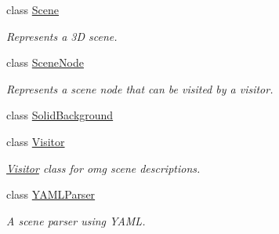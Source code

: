 \begin{DoxyCompactItemize}
class \mbox{\hyperlink{classomg_1_1_scene}{Scene}}
\begin{DoxyCompactList}\small\item\em Represents a 3D scene. \end{DoxyCompactList}\item 
class \mbox{\hyperlink{classomg_1_1_scene_node}{Scene\+Node}}
\begin{DoxyCompactList}\small\item\em Represents a scene node that can be visited by a visitor. \end{DoxyCompactList}\item 
class \mbox{\hyperlink{classomg_1_1_solid_background}{Solid\+Background}}
\item 
class \mbox{\hyperlink{classomg_1_1_visitor}{Visitor}}
\begin{DoxyCompactList}\small\item\em \mbox{\hyperlink{classomg_1_1_visitor}{Visitor}} class for omg scene descriptions. \end{DoxyCompactList}\item 
class \mbox{\hyperlink{classomg_1_1_y_a_m_l_parser}{Y\+A\+M\+L\+Parser}}
\begin{DoxyCompactList}\small\item\em A scene parser using Y\+A\+ML. \end{DoxyCompactList}\end{DoxyCompactItemize}
